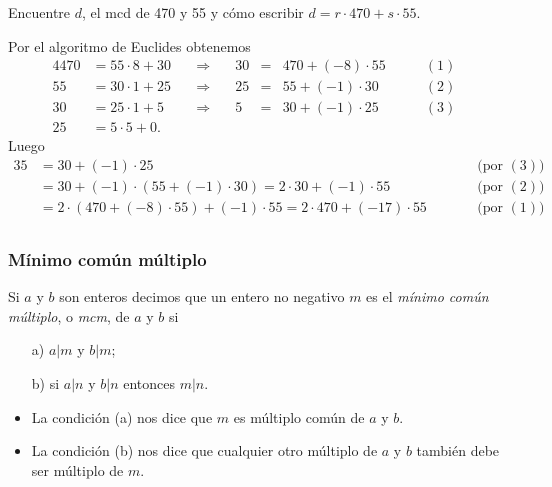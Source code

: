 \documentclass[handout]{beamer} %
\begin{document}
	\begin{frame}
		\begin{ejemplo} Encuentre $d$, el mcd de 470 y 55 y cómo escribir $d = r \cdot 470 + s \cdot 55$.
		\end{ejemplo} \pause
		\begin{solucion}\pause
			Por el algoritmo de Euclides obtenemos
			\begin{alignat*}4
				470&=55 \cdot 8 +30&\quad\Rightarrow\quad &30 &=&470 + (-8)\cdot 55&\qquad (1)&\\
				55&=30 \cdot 1 + 25&\quad\Rightarrow\quad &25 &=&55 +(-1)\cdot 30&\qquad (2)&\\
				30&=25 \cdot 1+5&\quad\Rightarrow\quad &5 &=&30 +(-1) \cdot 25&\qquad (3)& \\
				25&=5\cdot 5+0.&&&&&&
			\end{alignat*}\pause
			Luego
			\begin{alignat*}3
				5 &= 30 +(-1) \cdot 25& &\qquad \text{(por $(3)$)} && \\
				&= 30 + (-1) \cdot (55 +(-1)\cdot 30) = 2 \cdot 30 + (-1) \cdot 55& &\qquad \text{(por $(2)$)}&& \\   
				&=  2 \cdot (470 + (-8)\cdot 55) + (-1) \cdot 55 = 2 \cdot 470 +(-17)\cdot 55& &\qquad \text{(por $(1)$)}&&\\    
			\end{alignat*}
			
		\end{solucion}	
		
	\end{frame}
	
	
	\begin{frame}\frametitle{Mínimo común múltiplo}
		
		
		\begin{definicion}
			Si $a$ y $b$ son enteros decimos que un entero no negativo $m$ es el {\em
				mínimo común múltiplo}, o {\em mcm}, de $a$ y $b$ si
			\begin{enumerate}
				\item[a)] $ a|m$ y $b|m$;
				\item[b)] si $ a|n $ y $b|n$ entonces $ m|n$.
			\end{enumerate}
		\end{definicion}\pause
		\vskip 0.6cm
		\begin{itemize}
			\item La condición (a) nos dice que $m$ es múl\-ti\-plo común de $a$ y $b$. 
			\item La condición (b) nos dice que cualquier otro múltiplo de $a$ y $b$ también debe ser múltiplo de $m$.
		\end{itemize}
		
	\end{frame}
	
\end{document}
